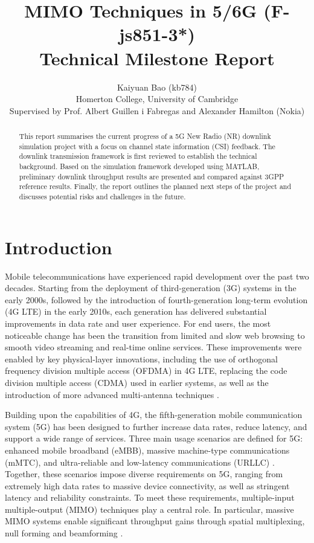 \documentclass[a4paper,12pt,onecolumn]{article}
\title{\LARGE \bf
	MIMO Techniques in 5/6G (F-js851-3*) \\
	Technical Milestone Report}
\author{
	Kaiyuan Bao (kb784)\\
	Homerton College, University of Cambridge\\[6pt]
	\small Supervised by Prof. Albert Guillen i Fabregas and Alexander Hamilton (Nokia)
}
\begin{document}
	\maketitle
	\vspace{-35pt}
	\begin{abstract}
	This report summarises the current progress of a 5G New Radio (NR) downlink simulation project with a focus on channel state information (CSI) feedback. The downlink transmission framework is first reviewed to establish the technical background. Based on the simulation framework developed using MATLAB, preliminary downlink throughput results are presented and compared against 3GPP reference results. Finally, the report outlines the planned next steps of the project and discusses potential risks and challenges in the future.



	\end{abstract}
	\pagestyle{plain}
	
	\vspace{-0.8cm}
	
\section{Introduction}

Mobile telecommunications have experienced rapid development over the past two decades. Starting from the deployment of third-generation (3G) systems in the early 2000s, followed by the introduction of fourth-generation long-term evolution (4G LTE) in the early 2010s, each generation has delivered substantial improvements in data rate and user experience. For end users, the most noticeable change has been the transition from limited and slow web browsing to smooth video streaming and real-time online services. These improvements were enabled by key physical-layer innovations, including the use of orthogonal frequency division multiple access (OFDMA) in 4G LTE, replacing the code division multiple access (CDMA) used in earlier systems, as well as the introduction of more advanced multi-antenna techniques \cite{Manikas}.

Building upon the capabilities of 4G, the fifth-generation mobile communication system (5G) has been designed to further increase data rates, reduce latency, and support a wide range of services. Three main usage scenarios are defined for 5G: enhanced mobile broadband (eMBB), massive machine-type communications (mMTC), and ultra-reliable and low-latency communications (URLLC) \cite{EricssonBook}. Together, these scenarios impose diverse requirements on 5G, ranging from extremely high data rates to massive device connectivity, as well as stringent latency and reliability constraints. To meet these requirements, multiple-input multiple-output (MIMO) techniques play a central role. In particular, massive MIMO systems enable significant throughput gains through spatial multiplexing, null forming and beamforming \cite{Ericsson_MIMO}.
\end{document}
